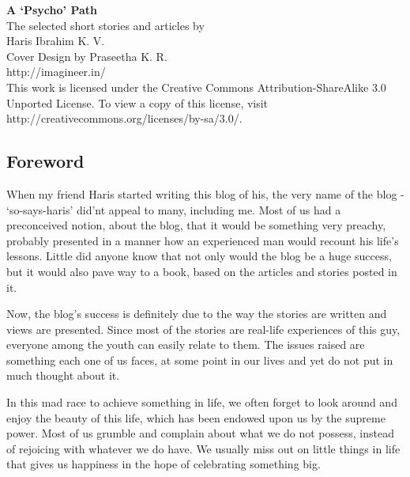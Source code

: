 \documentclass[twoside,11pt,titlepage]{article}
\begin{document}
\thispagestyle{plain}
\bigskip
\bigskip
\bigskip
\bigskip
\begin{center}
  \huge{\textbf{A `Psycho' Path}}\\
  \bigskip
  \LARGE{The selected short stories and articles by}\\
  \bigskip
  \LARGE{Haris Ibrahim K. V.}\\
  \bigskip
  \bigskip
  \bigskip
  \bigskip
  \normalsize{Cover Design by Praseetha K. R.}\\
  \normalsize{http://imagineer.in/}\\
  \bigskip
  \bigskip
  \bigskip
  \bigskip
  \bigskip
  \bigskip
  \bigskip
  \bigskip
  \bigskip
  \small{This work is licensed under the Creative Commons Attribution-ShareAlike 3.0 Unported License. To view a copy of this license, visit http://creativecommons.org/licenses/by-sa/3.0/.}
\end{center}
\cleardoublepage
\newpage
\tableofcontents
\newpage
\begin{center}
  \section{Foreword}
\end{center}

When my friend Haris started writing this blog of his, the very name of the blog - `so-says-haris' did'nt appeal to many, including me. Most of us had a preconceived notion, about the blog, that it would be something very preachy, probably presented in a manner how an experienced man would recount his life's lessons. Little did anyone know that not only would the blog be a huge success, but it would also pave way to a book, based on the articles and stories posted in it.

Now, the blog's success is definitely due to the way the stories are written and views are presented. Since most of the stories are real-life experiences of this guy, everyone among the youth can easily relate to them. The issues raised are something each one of us faces, at some point in our lives and yet do not put in much thought about it.

In this mad race to achieve something in life, we often forget to look around and enjoy the beauty of this life, which has been endowed upon us by the supreme power. Most of us grumble and complain about what we do not possess, instead of rejoicing with whatever we do have. We usually miss out on little things in life that gives us happiness in the hope of celebrating something big.
\end{document}

